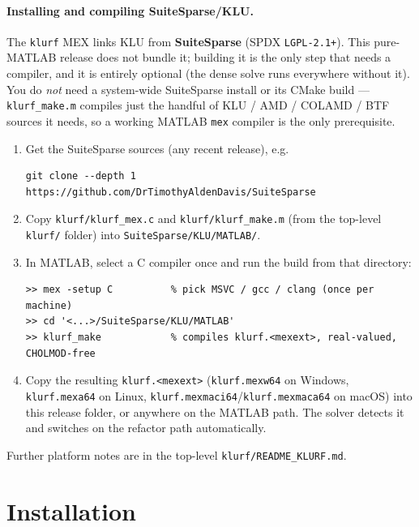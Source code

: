 \documentclass[11pt,a4paper]{article}
\newcommand{\code}[1]{\texttt{#1}}
\begin{document}
\paragraph{Installing and compiling SuiteSparse/KLU.}
The \code{klurf} MEX links KLU from \textbf{SuiteSparse} (SPDX \code{LGPL-2.1+}). This
pure-MATLAB release does not bundle it; building it is the only step that needs a compiler,
and it is entirely optional (the dense solve runs everywhere without it). You do \emph{not}
need a system-wide SuiteSparse install or its CMake build --- \code{klurf_make.m} compiles
just the handful of KLU / AMD / COLAMD / BTF sources it needs, so a working MATLAB
\code{mex} compiler is the only prerequisite.
\begin{enumerate}[leftmargin=1.6em]
  \item Get the SuiteSparse sources (any recent release), e.g.
\begin{lstlisting}[style=sh]
git clone --depth 1 https://github.com/DrTimothyAldenDavis/SuiteSparse
\end{lstlisting}
  \item Copy \code{klurf/klurf_mex.c} and \code{klurf/klurf_make.m} (from the top-level
        \code{klurf/} folder) into \code{SuiteSparse/KLU/MATLAB/}.
  \item In MATLAB, select a C compiler once and run the build from that directory:
\begin{lstlisting}[style=mat]
>> mex -setup C          % pick MSVC / gcc / clang (once per machine)
>> cd '<...>/SuiteSparse/KLU/MATLAB'
>> klurf_make            % compiles klurf.<mexext>, real-valued, CHOLMOD-free
\end{lstlisting}
  \item Copy the resulting \code{klurf.<mexext>} (\code{klurf.mexw64} on Windows,
        \code{klurf.mexa64} on Linux, \code{klurf.mexmaci64}/\code{klurf.mexmaca64} on macOS)
        into this release folder, or anywhere on the MATLAB path. The solver detects it and
        switches on the refactor path automatically.
\end{enumerate}
Further platform notes are in the top-level \code{klurf/README_KLURF.md}.

\section{Installation}
\end{document}
